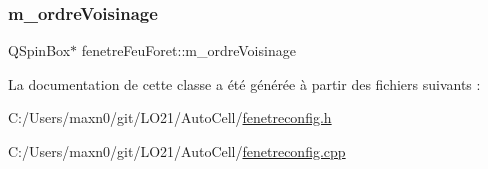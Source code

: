 \subsubsection{\texorpdfstring{m\+\_\+ordre\+Voisinage}{m\_ordreVoisinage}}
{\footnotesize\ttfamily Q\+Spin\+Box$\ast$ fenetre\+Feu\+Foret\+::m\+\_\+ordre\+Voisinage\hspace{0.3cm}{\ttfamily [private]}}



La documentation de cette classe a été générée à partir des fichiers suivants \+:\begin{DoxyCompactItemize}
\item 
C\+:/\+Users/maxn0/git/\+L\+O21/\+Auto\+Cell/\mbox{\hyperlink{fenetreconfig_8h}{fenetreconfig.\+h}}\item 
C\+:/\+Users/maxn0/git/\+L\+O21/\+Auto\+Cell/\mbox{\hyperlink{fenetreconfig_8cpp}{fenetreconfig.\+cpp}}\end{DoxyCompactItemize}
